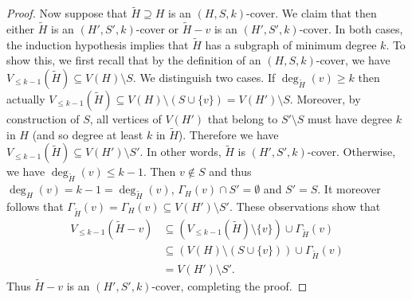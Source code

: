 \documentclass[11pt]{article}
\numberwithin{theorem}{section}
\begin{document}
\begin{proof}
  Now suppose that $\tilde H\supseteq H$ is an $(H,S,k)$-cover.
  We claim that then either $\tilde H$ is an $(H',S',k)$-cover or $\tilde H-v$ is
  an $(H',S',k)$-cover. In both cases, the induction hypothesis implies that
  $\tilde H$ has a subgraph of minimum degree $k$.
  To show this, we first recall that by the definition of an
  $(H,S,k)$-cover, we have $V_{\leq k-1}(\tilde H)\subseteq V(H)\setminus S$.
  We distinguish two cases. If $\deg_{\tilde H}(v)\geq k$ then actually
  $V_{\leq k-1}(\tilde H)\subseteq V(H)\setminus (S\cup \{v\}) =
  V(H')\setminus S$. Moreover, by construction of $S$, all vertices of $V(H')$
  that belong to $S'\setminus S$ must have degree $k$ in $H$ (and so degree at
  least $k$ in $\tilde H$). Therefore we have $V_{\leq k-1}(\tilde H)\subseteq
  V(H')\setminus S'$. In other words, $\tilde H$ is $(H',S',k)$-cover.
  Otherwise, we have
  $\deg_{\tilde H}(v)\leq k-1$. Then $v\notin S$ and thus
  $\deg_{H}(v)=k-1=\deg_{\tilde H}(v)$, $\Gamma_H(v)\cap S'=\emptyset$
  and $S'= S$.
  It
  moreover follows that $\Gamma_{\tilde H}(v) = \Gamma_H(v) \subseteq
  V(H')\setminus S'$.
  These  observations show that
  \begin{align*}
  V_{\leq k-1}(\tilde H-v) & \subseteq (V_{\leq k-1}(\tilde H)\setminus \{v\})
  \cup \Gamma_{\tilde H}(v) \\
  & \subseteq
   (V(H)\setminus (S\cup \{v\}))
  \cup \Gamma_{\tilde H}(v)  \\
  & = V(H')\setminus S'.
  \end{align*}
  Thus $\tilde H-v$ is an $(H',S',k)$-cover, completing the proof.
\end{proof}
\end{document}
